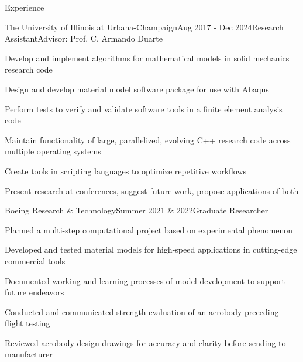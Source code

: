 \documentclass{resume} %
\begin{document}
\begin{rSection}{Experience}

\begin{rSubsection}{The University of Illinois at Urbana-Champaign}{Aug 2017 - Dec 2024}{Research Assistant}{Advisor: Prof. C. Armando Duarte}
\item Develop and implement algorithms for mathematical models in solid mechanics research code
\item Design and develop material model software package for use with Abaqus
\item Perform tests to verify and validate software tools in a finite element analysis code
\item Maintain functionality of large, parallelized, evolving C++ research code across multiple operating systems
\item Create tools in scripting languages to optimize repetitive workflows
\item Present research at conferences, suggest future work, propose applications of both
\end{rSubsection}


\begin{rSubsection}{Boeing Research \& Technology}{Summer 2021  \& 2022}{Graduate Researcher}{}
%
\item Planned a multi-step computational project based on experimental phenomenon
\item Developed and tested material models for high-speed applications in cutting-edge commercial tools
\item Documented working and learning processes of model development to support future endeavors
\item Conducted and communicated strength evaluation of an aerobody preceding flight testing
\item Reviewed aerobody design drawings for accuracy and clarity before sending to manufacturer
\end{rSubsection}


\end{rSection}

\end{document}
